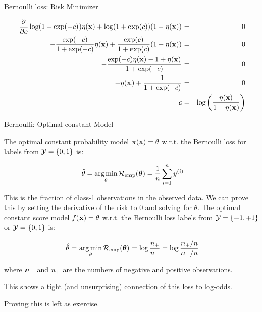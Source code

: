 \documentclass[11pt,compress,t,notes=noshow, xcolor=table]{beamer}
\begin{document}
\begin{vbframe}{Bernoulli loss: Risk Minimizer}
\begin{footnotesize}
  \begin{eqnarray*}
  \frac{\partial }{\partial c} \log(1 + \exp(-c)) \eta(\mathbf{x})+ \log(1 + \exp(c)) (1 - \eta(\mathbf{x})) &=& 0 \\
  - \frac{\exp(-c)}{1 + \exp(-c)} \eta(\mathbf{x}) + \frac{\exp(c)}{1 + \exp(c)} (1 - \eta(\mathbf{x})) &=& 0 \\ 
  - \frac{\exp(-c) \eta(\mathbf{x}) - 1 + \eta(\mathbf{x})}{1 + \exp(-c)} &=& 0 \\
  - \eta(\mathbf{x}) + \frac{1}{1 + \exp(-c)} &=& 0\\
   c &=& \log\left(\frac{\eta(\mathbf{x})}{1 - \eta(\mathbf{x})}\right)
  \end{eqnarray*}
\end{footnotesize}

\end{vbframe}



\begin{vbframe}{Bernoulli: Optimal constant Model}

{\small The optimal constant probability model $\pi(\mathbf{x}) = \theta$ w.r.t. the Bernoulli loss for labels from $\mathcal{Y} = \{0, 1\}$ is:

\begin{eqnarray*}
  \hat{\theta} = \mathop{\mathrm{arg\,min}}_{\theta} \mathcal{R}_{\text{emp}}(\bm{\theta}) = \frac{1}{n} \sum\limits_{i=1}^n y^{(i)}
\end{eqnarray*}

This is the fraction of class-1 observations in the observed data.
We can prove this by setting the derivative of the risk to 0 and solving for $\theta$. The optimal constant score model $f(\mathbf{x}) = \theta$ w.r.t. the Bernoulli loss labels from $\mathcal{Y} = \{-1, +1\}$ or $\mathcal{Y} = \{0, 1\}$ is:

\begin{eqnarray*}
  \hat{\theta} = \mathop{\mathrm{arg\,min}}_{\theta} \mathcal{R}_{\text{emp}}(\bm{\theta}) = \log \frac{n_{+}}{n_{-}} = \log \frac{n_{+} / n}{n_{-} /n} 
\end{eqnarray*}

where $n_{-}$ and $n_{+}$ are the numbers of negative and positive observations.%

This shows a tight (and unsurprising) connection of this loss to log-odds.

Proving this is left as exercise.
}

\end{vbframe}
\end{document}
